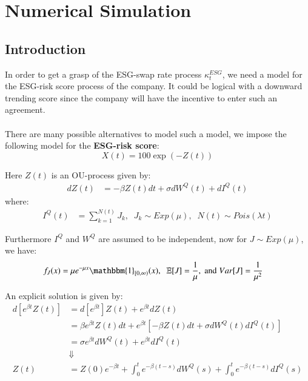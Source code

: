 \chapter{Numerical Simulation}

\section{Introduction}
In order to get a grasp of the ESG-swap rate process $\kappa_{t}^{ESG}$, we need a model for the ESG-risk score process of the company. It could be logical with a downward trending score since the company will have the incentive to enter such an agreement. 
\\~\\
There are many possible alternatives to model such a model, we impose the following model for the \textbf{ESG-risk score}:
\[
X(t) = 100\exp(-Z(t))
\]

Here $Z(t)$ is an OU-process
given by: 
\begin{align*}
dZ(t) &= -\beta Z(t)dt + \sigma dW^{Q}(t) + dI^{Q}(t)    
\end{align*} 
where: 
\begin{align*}
I^{Q}(t) &= \sum_{k=1}^{N(t)}J_{k}, \;\; J_{k}\sim Exp(\mu),\;\; N(t) \sim Pois(\lambda t)    
\end{align*} 

Furthermore $I^{Q}$ and $W^{Q}$ are assumed to be independent, now for $J\sim Exp(\mu)$, we have:
\begin{align*}
f_{J}(x) &= \mu e^{-\mu x}\mathbbm{1}_{[0,\infty)}(x), \;\; 
\E[J] = \frac{1}{\mu}, \;\text{and}\; Var[J] = \frac{1}{\mu^{2}}
\end{align*}

An explicit solution is given by: 
\begin{align}
\label{eq: characteristic_function_Z(t)}
d[e^{\beta t}Z(t)] &= d[e^{\beta t}]Z(t) + e^{\beta t}dZ(t) \nonumber \\ 
&= \beta e^{\beta t}Z(t)dt + e^{\beta t}[-\beta Z(t)dt + 
\sigma dW^{Q}(t) dI^{Q}(t)]
\nonumber \\ 
&=\sigma e^{\beta t}dW^{Q}(t) + e^{\beta t}dI^{Q}(t) \nonumber \\ 
&\Downarrow \nonumber\\ 
Z(t) &= Z(0)e^{-\beta t} +
\int_{0}^{t}e^{-\beta (t-s)}dW^{Q}(s) + 
\int_{0}^{t}e^{-\beta (t-s)}dI^{Q}(s)
\end{align} 



